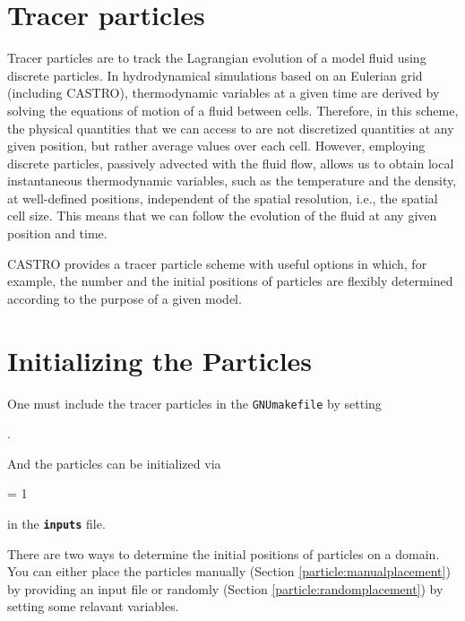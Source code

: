 

\section{Tracer particles}

Tracer particles are to track the Lagrangian evolution of a model fluid using discrete particles. In hydrodynamical simulations based on an Eulerian grid (including CASTRO), thermodynamic variables at a given time are derived by solving the equations of motion of a fluid between cells. Therefore, in this scheme, the physical quantities that we can access to are not discretized quantities at any given position, but rather average values over each cell. However, employing discrete particles, passively advected with the fluid flow, allows us to obtain local instantaneous thermodynamic variables, such as the temperature and the density, at well-defined positions, independent of the spatial resolution, i.e., the spatial cell size. This means that we can follow the evolution of the fluid at any given position and time. 

\noindent CASTRO provides a tracer particle scheme with useful options in which, for example, the number and the initial positions of particles are flexibly determined according to the purpose of a given model. 


\section{Initializing the Particles}

One must include the tracer particles in the {\tt GNUmakefile} by setting

\vspace{0.1in}
.
\vspace{0.1in}

\noindent And the particles can be initialized via

\vspace{0.1in}
     = 1
\vspace{0.1in}

\noindent in the {\tt {\bf inputs}} file.

\vspace{0.1in}
\noindent There are two ways to determine the initial positions of particles on a domain. You can either place the particles manually (Section \ref{particle:manualplacement}) by providing an input file or randomly (Section \ref{particle:randomplacement}) by setting some relavant variables.

